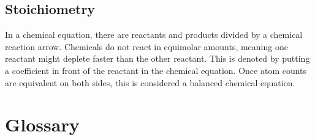 \documentclass[roman, 12pt, draft]{article}
\begin{document}
  \subsection{Stoichiometry}
    In a chemical equation, there are reactants and products divided by a chemical reaction arrow.
    Chemicals do not react in equimolar amounts, meaning one reactant might deplete faster than the other reactant.
    This is denoted by putting a coefficient in front of the reactant in the chemical equation.
    Once atom counts are equivalent on both sides, this is considered a balanced chemical equation. 
  \section{Glossary}
\end{document}
